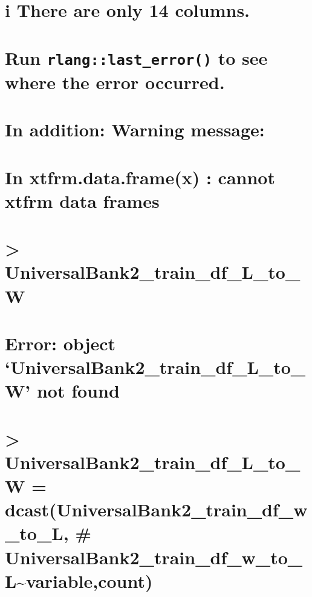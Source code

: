 \documentclass[
]{article}
\begin{document}
\hypertarget{i-there-are-only-14-columns.}{%
\section{i There are only 14
columns.}\label{i-there-are-only-14-columns.}}

\hypertarget{run-rlanglast_error-to-see-where-the-error-occurred.}{%
\section{\texorpdfstring{Run \texttt{rlang::last\_error()} to see where
the error
occurred.}{Run rlang::last\_error() to see where the error occurred.}}\label{run-rlanglast_error-to-see-where-the-error-occurred.}}

\hypertarget{in-addition-warning-message}{%
\section{In addition: Warning
message:}\label{in-addition-warning-message}}

\hypertarget{in-xtfrm.data.framex-cannot-xtfrm-data-frames}{%
\section{In xtfrm.data.frame(x) : cannot xtfrm data
frames}\label{in-xtfrm.data.framex-cannot-xtfrm-data-frames}}

\hypertarget{universalbank2_train_df_l_to_w}{%
\section{\textgreater{}
UniversalBank2\_train\_df\_L\_to\_W}\label{universalbank2_train_df_l_to_w}}

\hypertarget{error-object-universalbank2_train_df_l_to_w-not-found}{%
\section{Error: object `UniversalBank2\_train\_df\_L\_to\_W' not
found}\label{error-object-universalbank2_train_df_l_to_w-not-found}}

\hypertarget{universalbank2_train_df_l_to_w-dcastuniversalbank2_train_df_w_to_l-universalbank2_train_df_w_to_lvariablecount}{%
\section{\textgreater{} UniversalBank2\_train\_df\_L\_to\_W =
dcast(UniversalBank2\_train\_df\_w\_to\_L, \#
UniversalBank2\_train\_df\_w\_to\_L\textasciitilde variable,count)}\label{universalbank2_train_df_l_to_w-dcastuniversalbank2_train_df_w_to_l-universalbank2_train_df_w_to_lvariablecount}}
\end{document}
